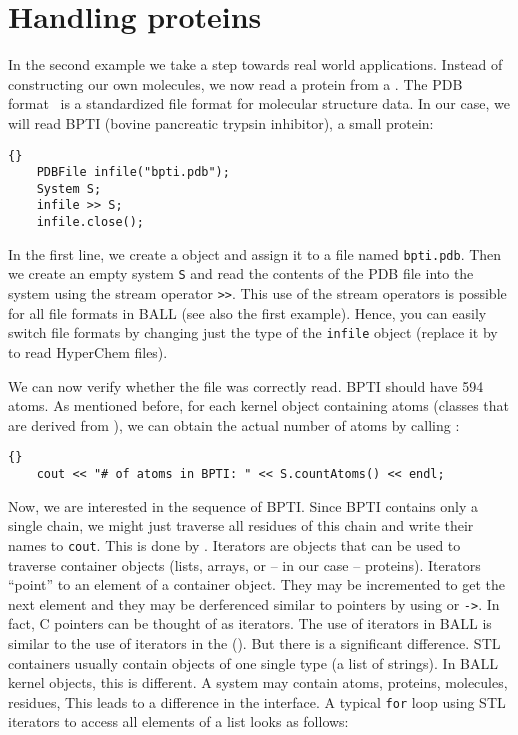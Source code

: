 \section{Handling proteins}

In the second example we take a step towards real world applications. Instead
of constructing our own molecules, we now read a protein from a . The PDB format~\cite{PDB} is a standardized file format for molecular structure
data. In our case, we will read BPTI (bovine pancreatic trypsin inhibitor), a
small protein:

\begin{lstlisting}{}
	PDBFile infile("bpti.pdb");
	System S;
	infile >> S;
	infile.close();
\end{lstlisting}

\noindent
In the first line, we create a  object and assign it to a file
named {\tt bpti.pdb}. Then we create an empty system {\tt S} and read the
contents of the PDB file into the system using the stream operator {\tt >>}.
This use of the stream operators is possible for all file formats in BALL (see
also the first example). Hence, you can easily switch file formats
by changing just the type of the {\tt infile} object (\eg replace it by
 to read HyperChem files).

We can now verify whether the file was correctly read. BPTI should have 594
atoms. As mentioned before, for each kernel object containing atoms
(\ie classes that are derived from ), we can obtain the
actual number of atoms by calling :

\begin{lstlisting}{}
	cout << "# of atoms in BPTI: " << S.countAtoms() << endl;
\end{lstlisting}

Now, we are interested in the sequence of BPTI. Since BPTI contains only a
single chain, we might just traverse all residues of this chain and write
their names to {\tt cout}. This is done by . Iterators are
objects that can be used to traverse container objects (\eg lists, arrays, or
-- in our case -- proteins). Iterators ``point'' to an element of a container
object. They may be incremented to get the next element and they may be
derferenced similar to pointers by using {\tt *} or {\tt ->}. In fact,
C pointers can be thought of as iterators.
The use of iterators in BALL is similar to the
use of iterators in the  ().
But there is a significant difference. STL containers usually contain objects of
one single type (\eg a list of strings). In BALL kernel objects, this is
different. A system may contain atoms, proteins, molecules, residues, \etc
This leads to a difference in the interface. A typical {\tt for} loop using STL
iterators to access all elements of a list looks as follows:


